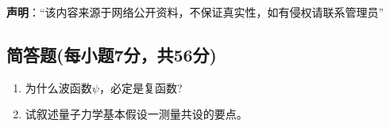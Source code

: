 
\textbf{声明}：“该内容来源于网络公开资料，不保证真实性，如有侵权请联系管理员”

\subsection{简答题(每小题7分，共56分)}
\begin{enumerate}
\item 为什么波函数$\psi$，必定是复函数?
\item 试叙述量子力学基本假设一测量共设的要点。
\end{enumerate}
